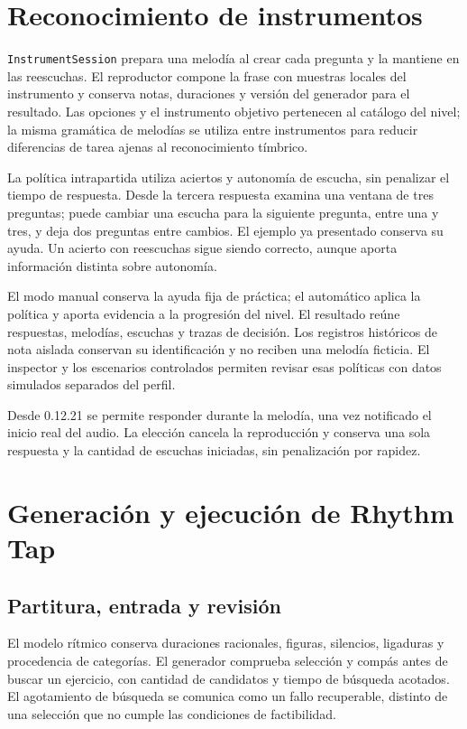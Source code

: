 \section{Reconocimiento de instrumentos}
\label{sec:implementacion-instrumentos}
\texttt{InstrumentSession} prepara una melodía al crear cada pregunta y la
mantiene en las reescuchas. El reproductor compone la frase con muestras locales
del instrumento y conserva notas, duraciones y versión del generador para el
resultado. Las opciones y el instrumento objetivo pertenecen al catálogo del
nivel; la misma gramática de melodías se utiliza entre instrumentos para
reducir diferencias de tarea ajenas al reconocimiento tímbrico.

La política intrapartida utiliza aciertos y autonomía de escucha, sin penalizar
el tiempo de respuesta. Desde la tercera respuesta examina una ventana de
tres preguntas; puede cambiar una escucha para la siguiente pregunta, entre
una y tres, y deja dos preguntas entre cambios. El ejemplo ya presentado
conserva su ayuda. Un acierto con reescuchas sigue siendo correcto, aunque
aporta información distinta sobre autonomía.

El modo manual conserva la ayuda fija de práctica; el automático aplica la
política y aporta evidencia a la progresión del nivel. El resultado reúne
respuestas, melodías, escuchas y trazas de decisión. Los registros históricos
de nota aislada conservan su identificación y no reciben una melodía ficticia.
El inspector y los escenarios controlados permiten revisar esas políticas
con datos simulados separados del perfil.

Desde 0.12.21 se permite responder durante la melodía, una vez notificado el
inicio real del audio. La elección cancela la reproducción y conserva una sola
respuesta y la cantidad de escuchas iniciadas, sin penalización por rapidez.

\section{Generación y ejecución de Rhythm Tap}
\label{sec:implementacion-ritmo}
\subsection{Partitura, entrada y revisión}
El modelo rítmico conserva duraciones racionales, figuras, silencios, ligaduras
y procedencia de categorías. El generador comprueba selección y compás antes
de buscar un ejercicio, con cantidad de candidatos y tiempo de búsqueda
acotados. El agotamiento de búsqueda se comunica como un fallo recuperable,
distinto de una selección que no cumple las condiciones de factibilidad.

